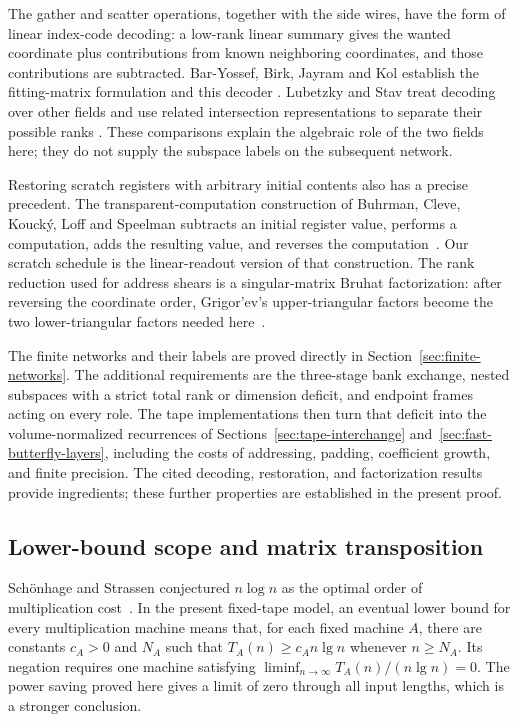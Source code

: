 \documentclass[11pt]{article}
\theoremstyle{definition}
\begin{document}
The gather and scatter operations, together with the side wires, have the
form of linear index-code decoding: a low-rank linear summary gives the
wanted coordinate plus contributions from known neighboring coordinates,
and those contributions are subtracted. Bar-Yossef, Birk, Jayram and Kol
establish the fitting-matrix formulation and this decoder
\cite[Section~3, proof of Theorem~5]{BarYossefBirkJayramKol2006}.
Lubetzky and Stav treat decoding over other fields and use related
intersection representations to separate their possible ranks
\cite[Proposition~2.1 and Section~2.3]{LubetzkyStav2009}.
These comparisons explain the algebraic role of the two fields here;
they do not supply the subspace labels on the subsequent network.

Restoring scratch registers with arbitrary initial contents also has a
precise precedent. The transparent-computation construction of Buhrman,
Cleve, Kouck\'y, Loff and Speelman subtracts an initial register value,
performs a computation, adds the resulting value, and reverses the
computation~\cite[Section~3]{BuhrmanCleveKouckyLoffSpeelman2014}.
Our scratch schedule is the linear-readout version of that construction.
The rank reduction used for address shears is a singular-matrix Bruhat
factorization: after reversing the coordinate order, Grigor'ev's
upper-triangular factors become the two lower-triangular factors needed
here~\cite[Appendix~A.2, Proposition~14(c)]{Grigoriev1982}.

The finite networks and their labels are proved directly in
Section~\ref{sec:finite-networks}. The additional requirements are the
three-stage bank exchange, nested subspaces with a strict total rank or
dimension deficit, and endpoint frames acting on every role. The tape
implementations then turn that deficit into the volume-normalized
recurrences of Sections~\ref{sec:tape-interchange}
and~\ref{sec:fast-butterfly-layers}, including the costs of addressing,
padding, coefficient growth, and finite precision. The cited decoding,
restoration, and factorization results provide ingredients; these further
properties are established in the present proof.

\subsection{Lower-bound scope and matrix transposition}

Sch\"onhage and Strassen conjectured $n\log n$ as the optimal order of
multiplication cost~\cite[Section~1]{SchonhageStrassen1971}. In the present
fixed-tape model, an eventual lower bound for every multiplication machine means that, for
each fixed machine $A$, there are constants $c_A>0$ and $N_A$ such that
$T_A(n)\ge c_A n\lg n$ whenever $n\ge N_A$.
Its negation requires one machine satisfying
$\liminf_{n\to\infty}T_A(n)/(n\lg n)=0$.
The power saving proved here gives a limit of zero through all input lengths,
which is a stronger conclusion.
\end{document}
